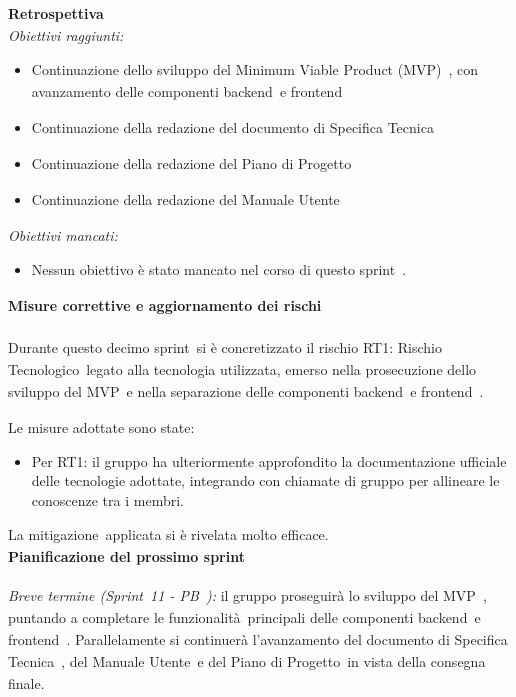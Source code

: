 \documentclass[a4paper,12pt]{article}
\newcommand{\pediceG}{\texorpdfstring{\textsubscript{\scalebox{0.6}{\textbf{G}}}~}{G}}
\begin{document}
\newpage
\noindent\textbf{Retrospettiva\pediceG}\\
\textit{Obiettivi raggiunti:}
\begin{itemize}
    \item Continuazione dello sviluppo del Minimum Viable Product (MVP)\pediceG, con avanzamento delle componenti backend\pediceG e frontend\pediceG
    \item Continuazione della redazione del documento di Specifica Tecnica\pediceG
    \item Continuazione della redazione del Piano di Progetto\pediceG
    \item Continuazione della redazione del Manuale Utente\pediceG
\end{itemize}
\textit{Obiettivi mancati:}
\begin{itemize}
    \item Nessun obiettivo è stato mancato nel corso di questo sprint\pediceG.
\end{itemize}
 
\noindent\textbf{Misure correttive e aggiornamento dei rischi\pediceG}\\\\
Durante questo decimo sprint\pediceG si è concretizzato il rischio RT1: Rischio Tecnologico\pediceG legato alla tecnologia utilizzata, emerso nella prosecuzione dello sviluppo del MVP\pediceG e nella separazione delle componenti backend\pediceG e frontend\pediceG.
 
Le misure adottate sono state:
\begin{itemize}
    \item Per RT1: il gruppo ha ulteriormente approfondito la documentazione ufficiale delle tecnologie adottate, integrando con chiamate di gruppo per allineare le conoscenze tra i membri.
\end{itemize}
 
La mitigazione\pediceG applicata si è rivelata molto efficace.\\
 
\noindent\textbf{Pianificazione del prossimo sprint}\\\\
\textit{Breve termine (Sprint\pediceG 11 - PB\pediceG):} il gruppo proseguirà lo sviluppo del MVP\pediceG, puntando a completare le funzionalità\pediceG principali delle componenti backend\pediceG e frontend\pediceG. Parallelamente si continuerà l'avanzamento del documento di  Specifica Tecnica\pediceG, del Manuale Utente\pediceG e del Piano di Progetto\pediceG in vista della consegna finale.
 
\end{document}
